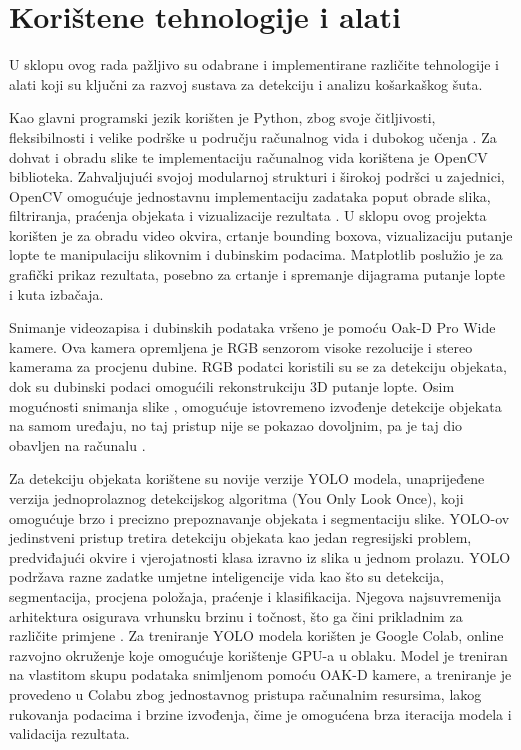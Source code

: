\documentclass[zavrsnirad]{fer}
\begin{document}
\chapter{Korištene tehnologije i alati}
\label{pog:korištene_tehnologije_i_alati}
U sklopu ovog rada pažljivo su odabrane i implementirane različite tehnologije i alati koji su ključni za razvoj sustava za detekciju i analizu košarkaškog šuta. 

Kao glavni programski jezik korišten je Python, zbog svoje čitljivosti, fleksibilnosti i velike podrške u području računalnog vida i dubokog učenja \cite{python}.
Za dohvat i obradu slike te implementaciju računalnog vida korištena je OpenCV biblioteka. Zahvaljujući svojoj modularnoj strukturi i širokoj podršci u zajednici, OpenCV omogućuje jednostavnu implementaciju zadataka poput obrade slika, filtriranja, praćenja objekata i vizualizacije rezultata \cite{opencv}. 
U sklopu ovog projekta korišten je za obradu video okvira, crtanje bounding boxova, vizualizaciju putanje lopte te manipulaciju slikovnim i dubinskim podacima.
Matplotlib poslužio je za grafički prikaz rezultata, posebno za crtanje i spremanje dijagrama putanje lopte i kuta izbačaja. 

Snimanje videozapisa i dubinskih podataka vršeno je pomoću Oak-D Pro Wide kamere. Ova kamera opremljena je RGB senzorom visoke rezolucije i stereo kamerama za procjenu dubine. 
RGB podatci koristili su se za detekciju objekata, dok su dubinski podaci omogućili rekonstrukciju 3D putanje lopte.
Osim mogućnosti snimanja slike , omogućuje istovremeno izvođenje detekcije objekata na samom uređaju, no taj pristup nije se pokazao dovoljnim, pa je taj dio obavljen na računalu \cite{depthai}.

Za detekciju objekata korištene su novije verzije YOLO modela, unaprijeđene verzija jednoprolaznog detekcijskog algoritma (You Only Look Once), koji omogućuje brzo i precizno prepoznavanje objekata i segmentaciju slike.
YOLO-ov jedinstveni pristup tretira detekciju objekata kao jedan regresijski problem, predviđajući okvire i vjerojatnosti klasa izravno iz slika u jednom prolazu.
YOLO podržava razne zadatke umjetne inteligencije vida kao što su detekcija, segmentacija, procjena položaja, praćenje i klasifikacija.
Njegova najsuvremenija arhitektura osigurava vrhunsku brzinu i točnost, što ga čini prikladnim za različite primjene \cite{ultralytics}.
Za treniranje YOLO modela korišten je Google Colab, online razvojno okruženje koje omogućuje korištenje GPU-a u oblaku. 
Model je treniran na vlastitom skupu podataka snimljenom pomoću OAK-D kamere, a treniranje je provedeno u Colabu zbog jednostavnog pristupa računalnim resursima, lakog rukovanja podacima i brzine izvođenja, čime je omogućena brza iteracija modela i validacija rezultata.
\end{document}

